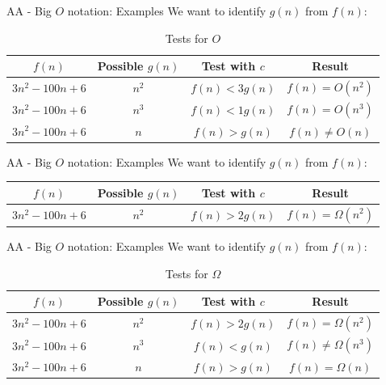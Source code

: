 \documentclass{beamer}
\begin{document}
\begin{frame}{AA - Big $O$ notation: Examples}
    We want to identify $g(n)$ from $f(n)$:
    \begin{table}[H]
        \centering
        \begin{tabular}{|c|c|c|c|}
            \hline
            $f(n)$ & Possible $g(n)$ & Test with $c$ & Result \\ \hline
            $3n^2-100n+6$ & $n^2$ & $f(n) < 3g(n)$ & $f(n) = O(n^2)$ \\ \hline
            $3n^2-100n+6$ & $n^3$ & $f(n) < 1g(n)$ & $f(n) = O(n^3)$ \\ \hline
            $3n^2-100n+6$ & $n$ & $f(n) > g(n)$ & $f(n) \neq O(n)$ \\ \hline
        \end{tabular}
        \caption{Tests for $O$}
    \end{table}
\end{frame}

\begin{frame}{AA - Big $O$ notation: Examples}
    We want to identify $g(n)$ from $f(n)$:
    \begin{table}[H]
        \centering
        \begin{tabular}{|c|c|c|c|}
            \hline
            $f(n)$ & Possible $g(n)$ & Test with $c$ & Result \\ \hline
            $3n^2-100n+6$ & $n^2$ & $f(n) > 2g(n)$ & $f(n) = \Omega(n^2)$ \\ \hline
        \end{tabular}
    \end{table}
\end{frame}

\begin{frame}{AA - Big $O$ notation: Examples}
    We want to identify $g(n)$ from $f(n)$:
    \begin{table}[H]
        \centering
        \begin{tabular}{|c|c|c|c|}
            \hline
            $f(n)$ & Possible $g(n)$ & Test with $c$ & Result \\ \hline
            $3n^2-100n+6$ & $n^2$ & $f(n) > 2g(n)$ & $f(n) = \Omega(n^2)$ \\ \hline
            $3n^2-100n+6$ & $n^3$ & $f(n) < g(n)$ & $f(n) \neq \Omega(n^3)$ \\ \hline
            $3n^2-100n+6$ & $n$ & $f(n) > g(n)$ & $f(n) = \Omega(n)$ \\ \hline
        \end{tabular}
        \caption{Tests for $\Omega$}
    \end{table}
\end{frame}
\end{document}
